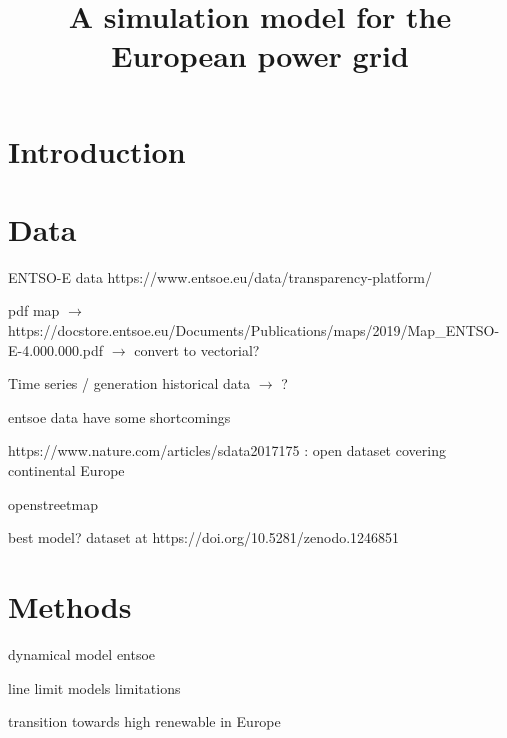 \documentclass[10pt]{article}
\title{A simulation model for the European power grid}
\author{}
\date{}
\begin{document}
\maketitle

\section{Introduction}

\section{Data}

ENTSO-E data https://www.entsoe.eu/data/transparency-platform/

pdf map $\rightarrow$ https://docstore.entsoe.eu/Documents/Publications/maps/2019/Map{\_}ENTSO-E-4.000.000.pdf 
$\rightarrow$ convert to vectorial?

Time series / generation historical data $\rightarrow$ ?

\cite{hirth2018entso} entsoe data have some shortcomings

\cite{jensen2017re} https://www.nature.com/articles/sdata2017175 : open dataset covering continental Europe

\cite{medjroubi2017open} openstreetmap

\cite{horsch2018pypsa} best model? dataset at https://doi.org/10.5281/zenodo.1246851 



\section{Methods}

\cite{hewes2016development} dynamical model entsoe

\cite{bourne2019don} line limit models limitations

\cite{brown2018synergies} transition towards high renewable in Europe





\end{document}
